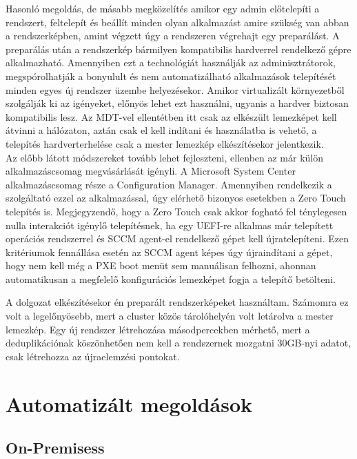 \documentclass[12pt,oneside,justify,table]{book}
\begin{document}
Hasonló megoldás, de másabb megközelítés amikor egy admin előtelepíti a rendszert, feltelepít és beállít minden olyan alkalmazást amire szükség van abban a rendszerképben, amint végzett úgy a rendszeren végrehajt egy preparálást. A preparálás után a rendszerkép bármilyen kompatibilis hardverrel rendelkező gépre alkalmazható. Amennyiben ezt a technológiát használják az adminisztrátorok, megspórolhatják a bonyulult és nem automatizálható alkalmazások telepítését minden egyes új rendszer üzembe helyezésekor. Amikor virtualizált környezetből szolgálják ki az igényeket, előnyös lehet ezt használni, ugyanis a hardver biztosan kompatibilis lesz. Az MDT-vel ellentétben itt csak az elkészült lemezképet kell átvinni a hálózaton, aztán csak el kell indítani és használatba is vehető, a telepítés hardverterhelése csak a mester lemezkép elkészítésekor jelentkezik. \\

Az előbb látott módszereket tovább lehet fejleszteni, ellenben az már külön alkalmazáscsomag megvásárlását igényli. A Microsoft System Center alkalmazáscsomag része a Configuration Manager. Amennyiben rendelkezik a szolgáltató ezzel az alkalmazással, úgy elérhető bizonyos esetekben a Zero Touch telepítés is. Megjegyzendő, hogy a Zero Touch csak akkor fogható fel ténylegesen nulla interakciót igénylő telepítésnek, ha egy UEFI-re alkalmas már telepített operációs rendszerrel és SCCM agent-el rendelkező gépet kell újratelepíteni. Ezen kritériumok fennállása esetén az SCCM agent képes úgy újraindítani a gépet, hogy nem kell még a PXE boot menüt sem manuálisan felhozni, ahonnan automatikusan a megfelelő konfigurációs lemezképet fogja a telepítő betölteni. 

A dolgozat elkészítésekor én preparált rendszerképeket használtam. Számomra ez volt a legelőnyösebb, mert a cluster közös tárolóhelyén volt letárolva a mester lemezkép. Egy új rendszer létrehozása másodpercekben mérhető, mert a deduplikációnak köszönhetően nem kell a rendszernek mozgatni 30GB-nyi adatot, csak létrehozza az újraelemzési pontokat.  

\section{Automatizált megoldások}

\subsection{On-Premisess}
\end{document}
